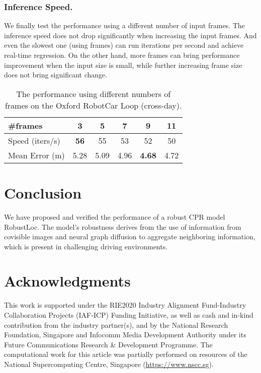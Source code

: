 \documentclass[letterpaper]{article} \usepackage{aaai23}  \usepackage{times}  \usepackage{helvet}  \usepackage{courier}  \usepackage[hyphens]{url}  \usepackage{graphicx} \urlstyle{rm} \def\UrlFont{\rm}  \usepackage{natbib}  \usepackage{caption} \frenchspacing  \setlength{\pdfpagewidth}{8.5in} \setlength{\pdfpageheight}{11in} \usepackage{booktabs}
\theoremstyle{remark}
\theoremstyle{plain}
\begin{document}
\subsubsection{Inference Speed.}
We finally test the performance using a different number of input frames. The inference speed does not drop significantly when increasing the input frames. And even the slowest one (using  frames) can run  iterations per second and achieve real-time regression.  On the other hand, more frames can bring performance improvement when the input size is small, while further increasing frame size does not bring significant change.

\begin{table}[!htp]\footnotesize
\centering
\begin{tabular}{l  c   c   c c c} 
\toprule
\multirow{1}{*}{\#frames} & \multicolumn{1}{c}{3} & \multicolumn{1}{c}{5} & \multicolumn{1}{c}{7} & \multicolumn{1}{c}{9} & \multicolumn{1}{c}{11} \\
\midrule
Speed (iters/s)  & \textbf{56}  & 55  & 53  &  52  &  50\\
Mean Error (m)   &  5.28  &  5.09  &  4.96 & \textbf{4.68}   & 4.72 \\
\bottomrule
\end{tabular}
\caption{The performance using different numbers of frames on the Oxford RobotCar Loop (cross-day).}
\vspace{-0.5cm}
\label{tab:additional insight}
\end{table}






\section{Conclusion}
We have proposed and verified the performance of a robust CPR model RobustLoc. The model's robustness derives from the use of information from covisible images and neural graph diffusion to aggregate neighboring information, which is present in challenging driving environments. 



\section{Acknowledgments}
This work is supported under the RIE2020 Industry Alignment Fund-Industry Collaboration Projects (IAF-ICP) Funding Initiative, as well as cash and in-kind contribution from the industry partner(s), and by the National Research Foundation, Singapore and Infocomm Media Development Authority under its Future Communications Research \& Development Programme. The computational work for this article was partially performed on resources of the National Supercomputing Centre, Singapore (\url{https://www.nscc.sg}).
\end{document}
